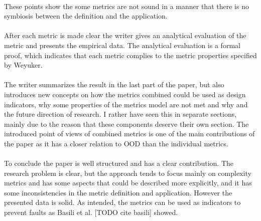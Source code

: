 \paragraph{}
These points show the some metrics are not sound in a manner that there is no symbiosis between the definition and
the application.

\paragraph{}
After each metric is made clear the writer gives an analytical evaluation of the metric and presents the empirical
data. The analytical evaluation is a formal proof, which indicates that each metric complies to the metric properties
specified by Weyuker.

\paragraph{}
The writer summarizes the result in the last part of the paper, but also introduces new concepts on how the metrics
combined could be used as design indicators, why some properties of the metrics model are not met and why and the
future direction of research. I rather have seen this in separate sections, mainly due to the reason that these
components deserve their own section. The introduced point of views of combined metrics is one of the main contributions
of the paper as it has a closer relation to OOD than the individual metrics.

\paragraph{}
To conclude the paper is well structured and has a clear contribution. The research problem is clear, but the
approach tends to focus mainly on complexity metrics and has some aspects that could be described more explicitly, and it
has some inconsistencies in the metric definition and application. However the presented data is solid.
As intended, the metrics can be used as indicators to prevent faults as Basili et al. [TODO cite basili] showed.
